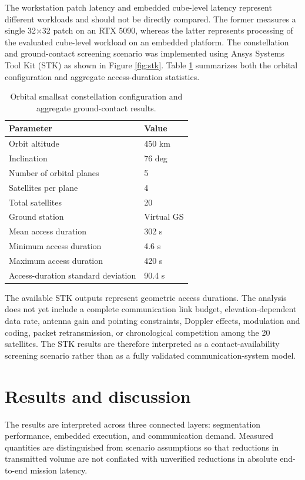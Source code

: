 \documentclass[a4paper,fleqn]{cas-dc}
\begin{document}
The workstation patch latency and embedded cube-level latency represent different workloads and should not be directly compared. The former measures a single 32×32 patch on an RTX 5090, whereas the latter represents processing of the evaluated cube-level workload on an embedded platform.
The constellation and ground-contact screening scenario was implemented using Ansys Systems Tool Kit (STK) as shown in Figure \ref{fig:stk}. Table \ref{tab:stk_config} summarizes both the orbital configuration and aggregate access-duration statistics.
\begin{table}[htb]
	\centering
	\caption{Orbital smallsat constellation configuration and aggregate ground-contact results.}
	\begin{tabularx}{\linewidth}{l X}
		\toprule\toprule
		\textbf{Parameter} & \textbf{Value} \\
		\midrule
		Orbit altitude                     & 450 km \\
		Inclination                        & 76 deg \\
		Number of orbital planes           & 5 \\
		Satellites per plane               & 4 \\
		Total satellites                   & 20 \\
		Ground station                     & Virtual GS \\
		Mean access duration               & 302 s \\
		Minimum access duration             & 4.6 s \\
		Maximum access duration             & 420 s \\
		Access-duration standard deviation & 90.4 s \\
		\bottomrule
	\end{tabularx}
	\label{tab:stk_config}
\end{table}
The available STK outputs represent geometric access durations. The analysis does not yet include a complete communication link budget, elevation-dependent data rate, antenna gain and pointing constraints, Doppler effects, modulation and coding, packet retransmission, or chronological competition among the 20 satellites. The STK results are therefore interpreted as a contact-availability screening scenario rather than as a fully validated communication-system model.
\section{Results and discussion}
The results are interpreted across three connected layers: segmentation performance, embedded execution, and communication demand. Measured quantities are distinguished from scenario assumptions so that reductions in transmitted volume are not conflated with unverified reductions in absolute end-to-end mission latency.
\end{document}
